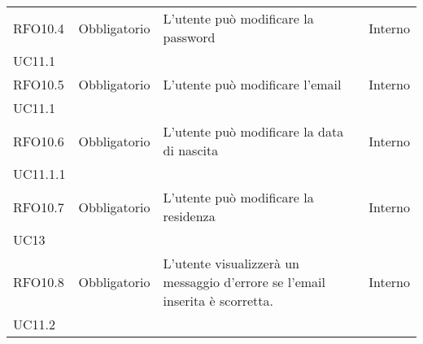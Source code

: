 \begin{longtable}{ >{\centering}p{} >{\centering}p{}
		>{\raggedright}p{} >{\centering}p{}}
	RFO10.4	&	Obbligatorio	&	L'utente può modificare la password	&	Interno \\ UC11.1	\tabularnewline
	RFO10.5	&	Obbligatorio	&	L'utente può modificare l'email	&	Interno \\ UC11.1	\tabularnewline
	RFO10.6	&	Obbligatorio	&	L'utente può modificare la data di nascita	&	Interno \\ UC11.1.1	\tabularnewline
	RFO10.7	&	Obbligatorio	&	L'utente può modificare la residenza	&	Interno  \\ UC13	\tabularnewline
	RFO10.8	&	Obbligatorio	&	L'utente visualizzerà un messaggio d'errore se l'email inserita è scorretta.	&	Interno \\ UC11.2	\tabularnewline
	
\end{longtable}


